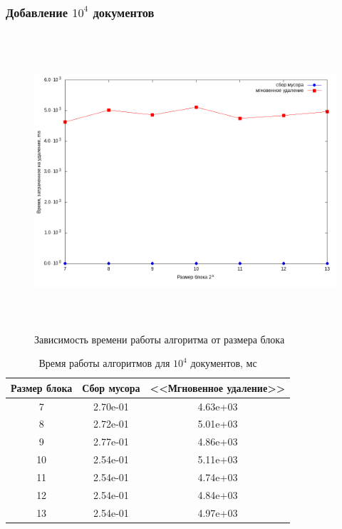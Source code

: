 \subsubsection{Добавление $10^4$ документов}
\begin{figure}[H]
\includegraphics[width=\linewidth, height=11cm]{fig/time_1e4.png}
\caption{Зависимость времени работы алгоритма от размера блока}
\end{figure}

\begin{table}[H]
      \caption{Время работы алгоритмов для $10^4$ документов, мс}
      \centering
      \small
      \singlespacing
      \begin{tabular}{|c|c|c|}
            \hline
            Размер блока & Сбор мусора                & <<Мгновенное удаление>> \\ \hline \hline
            7            & 2.70e-01	                  & 4.63e+03              \\ \hline
            8            & 2.72e-01	                  & 5.01e+03              \\ \hline
            9            & 2.77e-01	                  & 4.86e+03              \\ \hline
            10           & 2.54e-01                   & 5.11e+03              \\ \hline
            11           & 2.54e-01                   & 4.74e+03              \\ \hline
            12           & 2.54e-01	                  & 4.84e+03              \\ \hline
            13           & 2.54e-01	                  & 4.97e+03              \\ \hline
\end{tabular}
\end{table}

